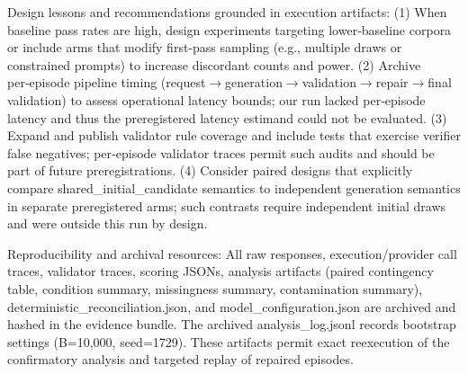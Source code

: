 \documentclass[conference]{IEEEtran}
\begin{document}
Design lessons and recommendations grounded in execution artifacts: (1) When baseline pass rates are high, design experiments targeting lower‑baseline corpora or include arms that modify first‑pass sampling (e.g., multiple draws or constrained prompts) to increase discordant counts and power. (2) Archive per‑episode pipeline timing (request\ensuremath{\rightarrow}generation\ensuremath{\rightarrow}validation\ensuremath{\rightarrow}repair\ensuremath{\rightarrow}final validation) to assess operational latency bounds; our run lacked per‑episode latency and thus the preregistered latency estimand could not be evaluated. (3) Expand and publish validator rule coverage and include tests that exercise verifier false negatives; per‑episode validator traces permit such audits and should be part of future preregistrations. (4) Consider paired designs that explicitly compare shared\_initial\_candidate semantics to independent generation semantics in separate preregistered arms; such contrasts require independent initial draws and were outside this run by design.

Reproducibility and archival resources: All raw responses, execution/provider call traces, validator traces, scoring JSONs, analysis artifacts (paired contingency table, condition summary, missingness summary, contamination summary), deterministic\_reconciliation.json, and model\_configuration.json are archived and hashed in the evidence bundle. The archived analysis\_log.jsonl records bootstrap settings (B=10,000, seed=1729). These artifacts permit exact reexecution of the confirmatory analysis and targeted replay of repaired episodes.
\end{document}
